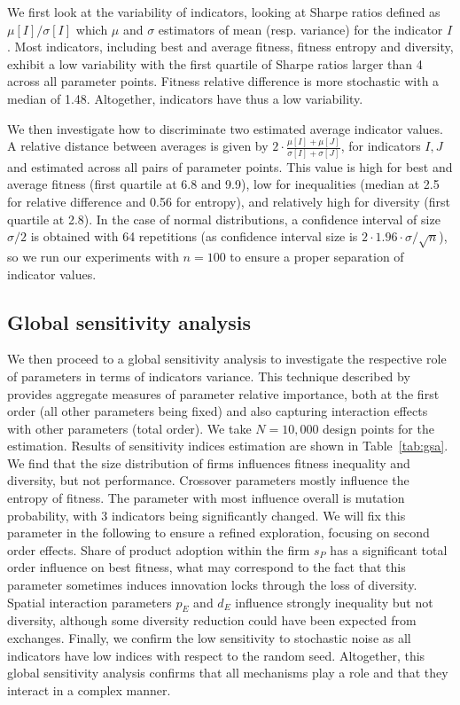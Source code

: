 \documentclass[letterpaper]{article}
\begin{document}
We first look at the variability of indicators, looking at Sharpe ratios defined as $\mu \left[ I \right] / \sigma \left[I \right]$ which $\mu$ and $\sigma$ estimators of mean (resp. variance) for the indicator $I$. Most indicators, including best and average fitness, fitness entropy and diversity, exhibit a low variability with the first quartile of Sharpe ratios larger than 4 across all parameter points. Fitness relative difference is more stochastic with a median of 1.48. Altogether, indicators have thus a low variability.

We then investigate how to discriminate two estimated average indicator values. A relative distance between averages is given by $2 \cdot \frac{\mu \left[ I \right] + \mu \left[ J \right]}{\sigma \left[I \right]+ \sigma \left[J \right]}$, for indicators $I,J$ and estimated across all pairs of parameter points. This value is high for best and average fitness (first quartile at 6.8 and 9.9), low for inequalities (median at 2.5 for relative difference and 0.56 for entropy), and relatively high for diversity (first quartile at 2.8). In the case of normal distributions, a confidence interval of size $\sigma/2$ is obtained with 64 repetitions (as confidence interval size is $2\cdot 1.96\cdot \sigma / \sqrt{n}$), so we run our experiments with $n=100$ to ensure a proper separation of indicator values.


\subsection{Global sensitivity analysis}

We then proceed to a global sensitivity analysis to investigate the respective role of parameters in terms of indicators variance. This technique described by \cite{saltelli2008global} provides aggregate measures of parameter relative importance, both at the first order (all other parameters being fixed) and also capturing interaction effects with other parameters (total order). We take $N = 10,000$ design points for the estimation. Results of sensitivity indices estimation are shown in Table~\ref{tab:gsa}. We find that the size distribution of firms influences fitness inequality and diversity, but not performance. Crossover parameters mostly influence the entropy of fitness. The parameter with most influence overall is mutation probability, with 3 indicators being significantly changed. We will fix this parameter in the following to ensure a refined exploration, focusing on second order effects. Share of product adoption within the firm $s_P$ has a significant total order influence on best fitness, what may correspond to the fact that this parameter sometimes induces innovation locks through the loss of diversity. Spatial interaction parameters $p_E$ and $d_E$ influence strongly inequality but not diversity, although some diversity reduction could have been expected from exchanges. Finally, we confirm the low sensitivity to stochastic noise as all indicators have low indices with respect to the random seed. Altogether, this global sensitivity analysis confirms that all mechanisms play a role and that they interact in a complex manner.
\end{document}
